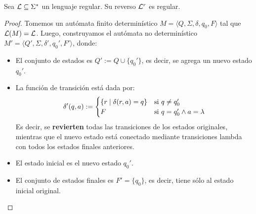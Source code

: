 \begin{theorem*}
    Sea $\mathcal{L} \subseteq \Sigma^*$ un lenguaje regular. Su reverso $\mathcal{L}^r$ es regular.
\end{theorem*}
\begin{proof}
    Tomemos un autómata finito determinístico $M = \langle Q, \Sigma, \delta, q_0, F \rangle$ tal que $\mathcal{L}(M) = \mathcal{L}$. Luego, construyamos el autómata no determinístico $M' = \langle Q', \Sigma, \delta', q_0', F' \rangle$, donde:
    \begin{itemize}
        \item El conjunto de estados es $Q' := Q \cup \{q_0'\}$, es decir, se agrega un nuevo estado $q_0'$.
        \item La función de transición está dada por:
              $$
                  \delta'(q, a) :=
                  \begin{cases}
                      \{r \mid \delta(r, a) = q\} & \text{si } q \neq q_0'                \\
                      F                           & \text{si } q = q_0' \land a = \lambda
                  \end{cases}
              $$
              Es decir, se \textbf{revierten} todas las transiciones de los estados originales, mientras que el nuevo estado está conectado mediante transiciones lambda con todos los estados finales anteriores.
        \item El estado inicial es el nuevo estado $q_0'$.
        \item El conjunto de estados finales es $F' = \{q_0\}$, es decir, tiene sólo al estado inicial original.
    \end{itemize}


\end{proof}
